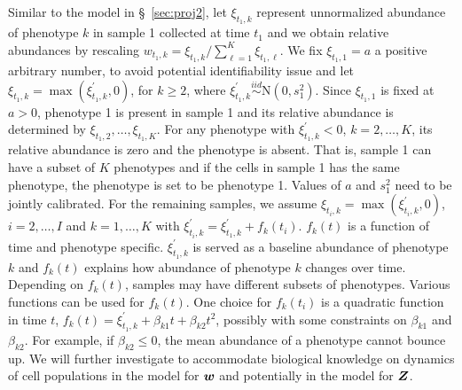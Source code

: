 \documentclass[12pt,]{article}
\newcommand{\N}{ \mathcal{N} }
\newcommand{\iid}{\overset{iid}{\sim}}
\def\N{\text{N}}
\newcommand{\bZ}{\mbox{\boldmath $Z$}}
\newcommand{\bw}{\mbox{\boldmath $w$}}
\begin{document}
Similar to the model in \S~\ref{sec:proj2}, let $\xi_{t_1,k}$ represent
unnormalized abundance of phenotype $k$ in sample 1 collected at time $t_1$ and
we obtain relative abundances by rescaling $w_{t_1,k}=
\xi_{t_1,k}/\sum_{\ell=1}^K \xi_{t_1, \ell}$.  We fix $\xi_{t_1,1}=a$ a
positive arbitrary number, to avoid potential identifiability issue and let
$\xi_{t_1,k} = \max(\xi^\prime_{t_1,k}, 0)$, for $k\ge 2$, where
$\xi^\prime_{t_1,k} \iid \N(0, s^2_1)$.  Since $\xi_{t_1, 1}$ is fixed at
$a>0$, phenotype 1 is present in sample 1 and its relative abundance is
determined by $\xi_{t_1, 2}, \ldots, \xi_{t_1, K}$.  For any phenotype with
$\xi^\prime_{t_1, k} < 0$, $k=2, \ldots, K$, its relative abundance is zero and
the phenotype is absent.  That is, sample 1 can have a subset of $K$ phenotypes
and if the cells in sample 1 has the same phenotype, the phenotype is set to be
phenotype 1. Values of $a$ and $s^2_1$ need to be jointly calibrated. For the
remaining samples, we assume $\xi_{t_i,k} = \max(\xi^\prime_{t_i,k}, 0)$, $i=2,
\ldots, I$ and $k=1, \ldots, K$ with $\xi^\prime_{t_i,k} = \xi^\prime_{t_1, k}
+ f_k(t_i)$. $f_k(t)$ is a function of time and phenotype specific.
$\xi^\prime_{t_1, k}$ is served as a baseline abundance of phenotype $k$ and
$f_k(t)$ explains how abundance of phenotype $k$ changes over time.
Depending on $f_k(t)$, samples may have different subsets of phenotypes.
Various functions can be used for $f_k(t)$.  One choice for $f_k(t_i)$ is a
quadratic function in time $t$, $f_k(t) = \xi^\prime_{t_1,k} + \beta_{k1}t +
\beta_{k2}t^2$, possibly with some constraints on $\beta_{k1}$ and
$\beta_{k2}.$  For example, if $\beta_{k2} \leq 0$, the mean abundance of a
phenotype cannot bounce up.  We will further investigate to accommodate
biological knowledge on dynamics of cell populations in the model for $\bw$ and
potentially in the model for $\bZ$.   

\end{document}
